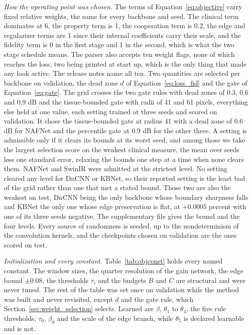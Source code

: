 \emph{How the operating point was chosen.} \label{sec:weight_selection}The terms of
Equation~\eqref{eq:objective} carry fixed relative weights, the same for every backbone and seed. The
clinical term dominates at 6, the property term is 1, the cooperation term is 0.2, the edge and
regularizer terms are 1 since their internal coefficients carry their scale, and the fidelity term is
0 in the first stage and 1 in the second, which is what the two stage schedule means. The parser also
accepts ten weight flags, none of which reaches the loss, two being printed at start up, which is the
only thing that made any look active. The release notes name all ten. Two quantities
are selected per backbone on validation, the dead zone $d$ of Equation~\eqref{eq:loss_fid} and the
gate of Equation~\eqref{eq:gate}. The grid crosses the two gate rules with dead zones of 0.3, 0.6 and
0.9 dB and the tissue-bounded gate with radii of 41 and 61 pixels, everything else held at one value,
each setting trained at three seeds and scored on validation. It chose the tissue-bounded gate at
radius 41 with a dead zone of 0.6 dB for NAFNet and the percentile gate at 0.9 dB for the other three.
A setting is admissible only if it clears its bounds at its worst seed, and among those we take the
largest selection score on the weakest clinical measure, the mean over seeds less one standard error, relaxing the bounds one step at a
time when none clears them. NAFNet and SwinIR were admitted at the strictest level. No setting
cleared any level for DnCNN or KBNet, so their reported setting is the least bad of the grid rather
than one that met a stated bound. Those two are also the weakest on test, DnCNN being the only
backbone whose boundary sharpness falls and KBNet the only one whose edge preservation is flat, at
$+0.0005$ percent with one of its three seeds negative.
The supplementary file gives the bound and the four levels. Every source of randomness is seeded, up to the nondeterminism
of the convolution kernels, and the checkpoints chosen on validation are the ones scored on test.

\emph{Initialization and every constant.} \label{sec:constants}Table~\ref{tab:objconst} holds every named constant. The window sizes, the quarter resolution of the
gain network, the edge bound $\pm 0.08$, the thresholds $\tau_i$ and the budgets $B$ and $C$ are
structural and were never tuned. The rest of the table was set once on validation while the method
was built and never revisited, except $d$ and the gate rule, which
Section~\ref{sec:weight_selection} selects. Learned are $\beta$, $\theta_1$ to $\theta_4$, the five
rule thresholds, $\tau_0$, $\beta_0$ and the scale of the edge branch, while $\theta_5$ is declared
learnable and is not.

